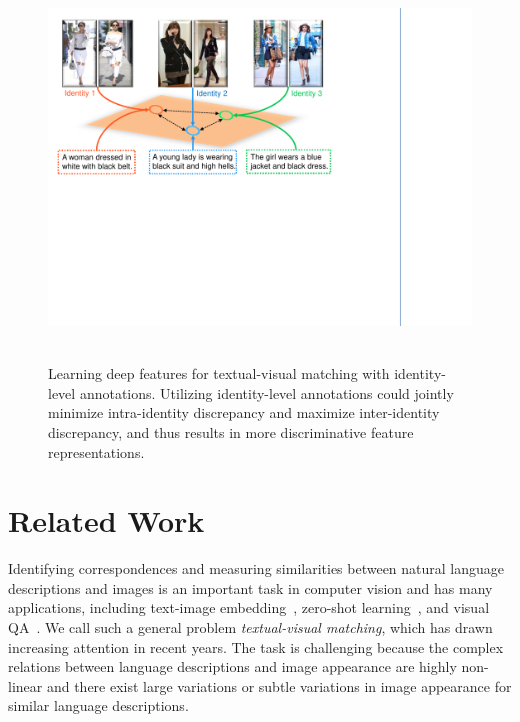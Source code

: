 \begin{figure}
\begin{center}
\includegraphics[width=0.9\linewidth]{figures/textual_visual_matching/intro_2.pdf} \ \\
\end{center}
\vspace{-8pt}
\caption{Learning deep features for textual-visual matching with identity-level annotations. Utilizing identity-level annotations could jointly minimize intra-identity discrepancy and maximize inter-identity discrepancy, and thus results in more discriminative feature representations.}
\label{fig:intro}
\vspace{-7pt}
\end{figure}

\section{Related Work} %
Identifying correspondences and measuring similarities between natural language descriptions and images is an important task in computer vision and has many applications, including text-image embedding~\cite{mao2014explain, Yan_2015_CVPR, wang2016learning, reed2016learning}, zero-shot learning~\cite{palatucci2009zero, rohrbach2011evaluating, frome2013devise}, and visual QA~\cite{Antol_2015_ICCV, fukui2016multimodal, zhu2016visual7w, nam2016dual, lu2016hierarchical}. We call such a general problem \emph{textual-visual matching}, which has drawn increasing attention in recent years. The task is challenging because the complex relations between language descriptions and image appearance are highly non-linear and there exist large variations or subtle variations in image appearance for similar language descriptions.

